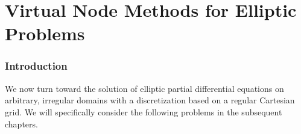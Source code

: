 %

\part{Virtual Node Methods for Elliptic Problems}

\renewcommand{\thechapter}{\thepart}

\section*{Introduction}

We now turn toward the solution of elliptic partial differential equations on arbitrary, irregular domains with a discretization based on a regular Cartesian grid. We will specifically consider the following problems in the subsequent chapters.

